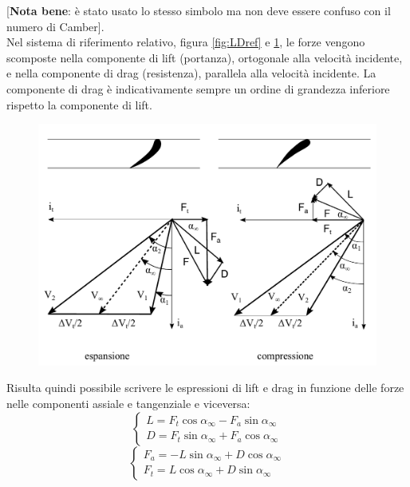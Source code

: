 [\textbf{Nota bene}: è stato usato lo stesso simbolo ma non deve essere confuso con il numero di Camber].\\
Nel sistema di riferimento relativo, figura \ref{fig:LDref} e \ref{fig:triang1}, le forze vengono scomposte nella componente di lift (portanza), ortogonale alla velocità incidente, e nella componente di drag (resistenza), parallela alla velocità incidente. La componente di drag è indicativamente sempre un ordine di grandezza inferiore rispetto la componente di lift.
\begin{figure}
\centering
  \includegraphics[width=.7\textwidth]{fig/triang1.pdf}
\caption{}
\label{fig:triang1}
\end{figure}
Risulta quindi possibile scrivere le espressioni di lift e drag in funzione delle forze nelle componenti assiale e tangenziale e viceversa:
\begin{equation}\label{eq:c_L}
	\begin{cases} 
		L = F_t \cos \alpha_{\infty} -  F_a \sin \alpha_{\infty}\\
		D = F_t \sin \alpha_{\infty} +  F_a \cos \alpha_{\infty}
	\end{cases}
\end{equation}
\begin{equation}
	\begin{cases} 
		F_a = - L\sin \alpha_{\infty} +  D \cos \alpha_{\infty}\\
		F_t = L \cos \alpha_{\infty} +  D \sin \alpha_{\infty}
	\end{cases}
\end{equation}
